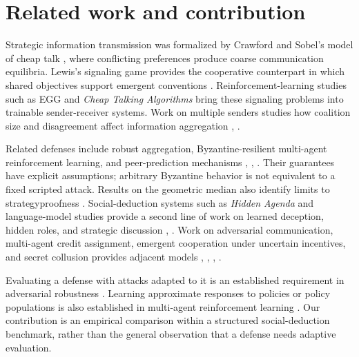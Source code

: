 \documentclass[
  12pt,
]{article}
\begin{document}
\section{Related work and
contribution}\label{related-work-and-contribution}

Strategic information transmission was formalized by Crawford and
Sobel's model of cheap talk , where
conflicting preferences produce coarse communication equilibria. Lewis's
signaling game provides the cooperative counterpart in which shared
objectives support emergent conventions
. Reinforcement-learning studies such
as EGG  and \emph{Cheap Talking
Algorithms}  bring these signaling
problems into trainable sender-receiver systems. Work on multiple
senders studies how coalition size and disagreement affect information
aggregation ,
.

Related defenses include robust aggregation, Byzantine-resilient
multi-agent reinforcement learning, and peer-prediction mechanisms
, ,
. Their guarantees have explicit
assumptions; arbitrary Byzantine behavior is not equivalent to a fixed
scripted attack. Results on the geometric median also identify limits to
strategyproofness . Social-deduction
systems such as \emph{Hidden Agenda} and language-model studies provide
a second line of work on learned deception, hidden roles, and strategic
discussion ,
. Work on adversarial communication,
multi-agent credit assignment, emergent cooperation under uncertain
incentives, and secret collusion provides adjacent models
,
, ,
.

Evaluating a defense with attacks adapted to it is an established
requirement in adversarial robustness
. Learning approximate responses to
policies or policy populations is also established in multi-agent
reinforcement learning . Our
contribution is an empirical comparison within a structured
social-deduction benchmark, rather than the general observation that a
defense needs adaptive evaluation.
\end{document}
